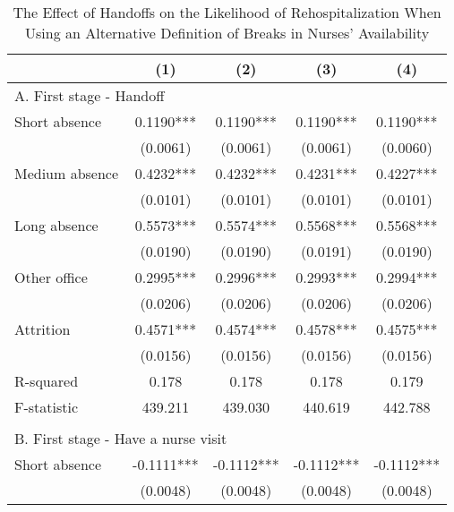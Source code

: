 \documentclass[final,12pt, notitlepage]{article}
\begin{document}
\begin{singlespace}
\begin{table}[H]
\footnotesize
\setlength\tabcolsep{0pt}
\centering
\caption{The Effect of Handoffs on the Likelihood of Rehospitalization When Using an Alternative Definition of Breaks in Nurses' Availability}
\label{tab:iv_robust}
\begin{threeparttable}
{
\def\sym#1{\ifmmode^{#1}\else\(^{#1}\)\fi}
\begin{tabular*}{\textwidth}{l@{\extracolsep{\fill}}*{4}{c}}
\toprule
                    &\multicolumn{1}{c}{(1)}&\multicolumn{1}{c}{(2)}&\multicolumn{1}{c}{(3)}&\multicolumn{1}{c}{(4)}\\
\midrule
\multicolumn{5}{l}{A. First stage - Handoff} \\
Short absence       &      0.1190***&      0.1190***&      0.1190***&      0.1190***\\
                    &    (0.0061)   &    (0.0061)   &    (0.0061)   &    (0.0060)   \\
Medium absence      &      0.4232***&      0.4232***&      0.4231***&      0.4227***\\
                    &    (0.0101)   &    (0.0101)   &    (0.0101)   &    (0.0101)   \\
Long absence        &      0.5573***&      0.5574***&      0.5568***&      0.5568***\\
                    &    (0.0190)   &    (0.0190)   &    (0.0191)   &    (0.0190)   \\
Other office        &      0.2995***&      0.2996***&      0.2993***&      0.2994***\\
                    &    (0.0206)   &    (0.0206)   &    (0.0206)   &    (0.0206)   \\
Attrition           &      0.4571***&      0.4574***&      0.4578***&      0.4575***\\
                    &    (0.0156)   &    (0.0156)   &    (0.0156)   &    (0.0156)   \\
R-squared           &       0.178   &       0.178   &       0.178   &       0.179   \\
F-statistic         &     439.211   &     439.030   &     440.619   &     442.788   \\
\\
\multicolumn{5}{l}{B. First stage - Have a nurse visit} \\
Short absence       &     -0.1111***&     -0.1112***&     -0.1112***&     -0.1112***\\
                    &    (0.0048)   &    (0.0048)   &    (0.0048)   &    (0.0048)   \\

\end{tabular*}}
\end{threeparttable}
\end{table}
\end{singlespace}
\end{document}
